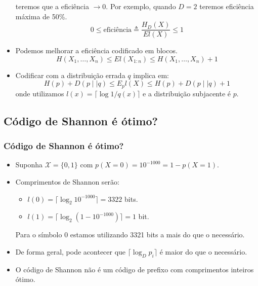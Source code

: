 \begin{frame}[allowframebreaks]
\begin{itemize}
	teremos que a eficiência $\rightarrow 0$. Por exemplo, quando $D=2$ teremos eficiência máxima de 50\%.
	\begin{equation}
	0 \leq \text{eficiência} \triangleq \frac{H_D (X)}{E l(X)} \leq 1
	\end{equation}
  \item Podemos melhorar a eficiência codificado em blocos.
	\begin{equation}
	H(X_1, \ldots, X_n) \leq E l(X_{1:n}) \leq H(X_1, \ldots, X_n) + 1
	\end{equation}
  \item Codificar com a distribuição errada $q$ implica em:
	\begin{equation}
	H(p) + D(p \mid \mid q) \leq E_p l(X) \leq H(p) + D(p \mid\mid q) + 1
	\end{equation}
	onde utilizamos $l(x) = \lceil \log 1/q(x) \rceil$ e a distribuição subjacente é $p$.
  \end{itemize}
\end{frame}


\subsection{Código de Shannon é ótimo?}
\begin{frame}[allowframebreaks]
  \frametitle{Código de Shannon é ótimo?}
  \begin{example}
  \begin{itemize}
  \item Suponha $\mathcal{X} = \{0,1\}$ com $p(X = 0) = 10^{-1000} = 1 - p(X=1)$.
  \item Comprimentos de Shannon serão: 
	\begin{itemize}
	\item $l(0) = \lceil \log_2 10^{-1000} \rceil = 3322$ bits.
	\item $l(1) = \lceil \log_2 (1 - 10^{-1000}) \rceil = 1$ bit.
	\end{itemize}
	Para o símbolo $0$ estamos utilizando 3321 bits a mais do que o necessário.
  \item De forma geral, pode acontecer que $\lceil \log_D p_i \rceil$ é maior do que o necessário.
  \item O código de Shannon não é um código de prefixo com comprimentos inteiros ótimo.
  \end{itemize}
  \end{example}
\end{frame}


